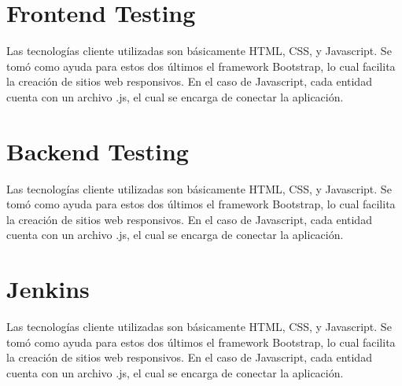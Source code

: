 \documentclass{article}
\begin{document}
	\section{Frontend Testing}
	Las tecnologías cliente utilizadas son básicamente HTML, CSS, y Javascript. Se tomó como ayuda para estos dos últimos el framework Bootstrap, lo cual facilita la creación de sitios web responsivos.
	\linebreak
	En el caso de Javascript, cada entidad cuenta con un archivo .js, el cual se encarga de conectar la aplicación. 

	\section{Backend Testing}
	Las tecnologías cliente utilizadas son básicamente HTML, CSS, y Javascript. Se tomó como ayuda para estos dos últimos el framework Bootstrap, lo cual facilita la creación de sitios web responsivos.
	\linebreak
	En el caso de Javascript, cada entidad cuenta con un archivo .js, el cual se encarga de conectar la aplicación. 
	
	\section{Jenkins}
	Las tecnologías cliente utilizadas son básicamente HTML, CSS, y Javascript. Se tomó como ayuda para estos dos últimos el framework Bootstrap, lo cual facilita la creación de sitios web responsivos.
	\linebreak
	En el caso de Javascript, cada entidad cuenta con un archivo .js, el cual se encarga de conectar la aplicación. 
\end{document}
